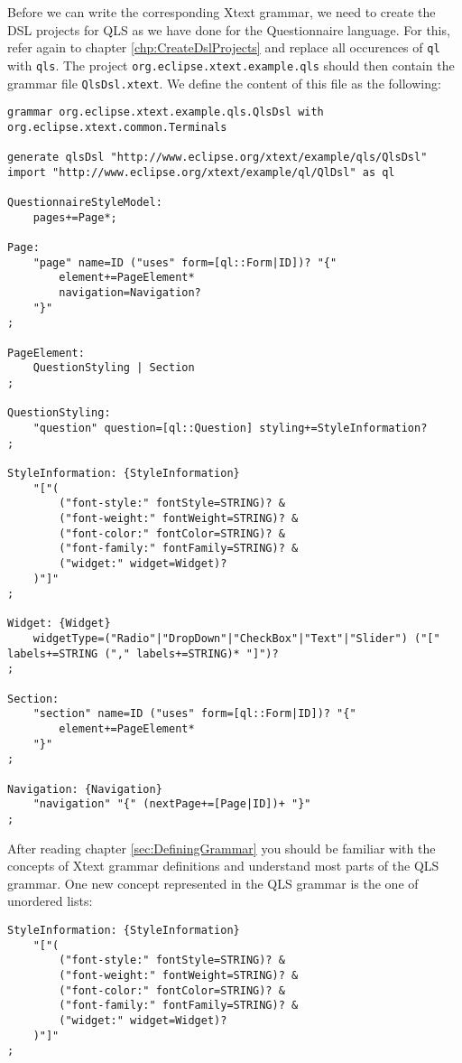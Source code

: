 Before we can write the corresponding Xtext grammar, we need to create the DSL 
projects for QLS as we have done for the Questionnaire language. For this, refer
again to chapter \ref{chp:CreateDslProjects} and replace all occurences of 
\texttt{ql} with \texttt{qls}. The project \texttt{org.eclipse.xtext.example.qls}
should then contain the grammar file \texttt{QlsDsl.xtext}. We define the content
of this file as the following:

\begin{lstlisting}[language=Xtext]
grammar org.eclipse.xtext.example.qls.QlsDsl with org.eclipse.xtext.common.Terminals

generate qlsDsl "http://www.eclipse.org/xtext/example/qls/QlsDsl"
import "http://www.eclipse.org/xtext/example/ql/QlDsl" as ql

QuestionnaireStyleModel:
	pages+=Page*;
	
Page:
	"page" name=ID ("uses" form=[ql::Form|ID])? "{"
		element+=PageElement*
		navigation=Navigation?
	"}"
;

PageElement:
	QuestionStyling | Section
;

QuestionStyling:
	"question" question=[ql::Question] styling+=StyleInformation?	
;

StyleInformation: {StyleInformation}
	"["(
		("font-style:" fontStyle=STRING)? &
		("font-weight:" fontWeight=STRING)? &
		("font-color:" fontColor=STRING)? &
		("font-family:" fontFamily=STRING)? &
		("widget:" widget=Widget)?
	)"]"
;

Widget: {Widget}
	widgetType=("Radio"|"DropDown"|"CheckBox"|"Text"|"Slider") ("[" labels+=STRING ("," labels+=STRING)* "]")?
;
  
Section:
	"section" name=ID ("uses" form=[ql::Form|ID])? "{"
		element+=PageElement*
	"}"
;

Navigation: {Navigation}
	"navigation" "{" (nextPage+=[Page|ID])+ "}"
;
\end{lstlisting}

After reading chapter \ref{sec:DefiningGrammar} you should be familiar with the
concepts of Xtext grammar definitions and understand most parts of the QLS grammar.
One new concept represented in the QLS grammar is the one of unordered lists:

\begin{lstlisting}[language=Xtext]
StyleInformation: {StyleInformation}
	"["(
		("font-style:" fontStyle=STRING)? &
		("font-weight:" fontWeight=STRING)? &
		("font-color:" fontColor=STRING)? &
		("font-family:" fontFamily=STRING)? &
		("widget:" widget=Widget)?
	)"]"
;
\end{lstlisting}

